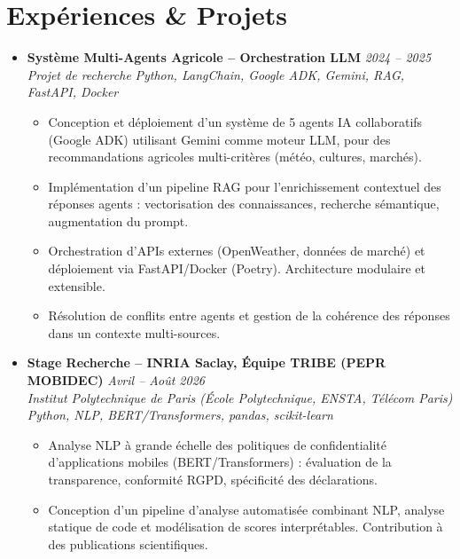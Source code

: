 \documentclass[a4paper,11pt]{article}
\begin{document}
\section{Expériences \& Projets}
\begin{itemize}[leftmargin=*, label={-}]

\item \textbf{Système Multi-Agents Agricole -- Orchestration LLM} \hfill \textit{2024 -- 2025} \\
\textit{Projet de recherche} \hfill \textit{Python, LangChain, Google ADK, Gemini, RAG, FastAPI, Docker}
\vspace{-2pt}
    \begin{itemize}[leftmargin=0.4cm, nosep, label=\tiny$\bullet$]
        \item \small{Conception et déploiement d'un système de 5 agents IA collaboratifs (Google ADK) utilisant Gemini comme moteur LLM, pour des recommandations agricoles multi-critères (météo, cultures, marchés).}
        \item \small{Implémentation d'un pipeline RAG pour l'enrichissement contextuel des réponses agents : vectorisation des connaissances, recherche sémantique, augmentation du prompt.}
        \item \small{Orchestration d'APIs externes (OpenWeather, données de marché) et déploiement via FastAPI/Docker (Poetry). Architecture modulaire et extensible.}
        \item \small{Résolution de conflits entre agents et gestion de la cohérence des réponses dans un contexte multi-sources.}
    \end{itemize}
\vspace{3pt}

\item \textbf{Stage Recherche -- INRIA Saclay, Équipe TRIBE (PEPR MOBIDEC)} \hfill \textit{Avril -- Août 2026} \\
\textit{Institut Polytechnique de Paris (École Polytechnique, ENSTA, Télécom Paris)} \hfill \textit{Python, NLP, BERT/Transformers, pandas, scikit-learn}
\vspace{-2pt}
    \begin{itemize}[leftmargin=0.4cm, nosep, label=\tiny$\bullet$]
        \item \small{Analyse NLP à grande échelle des politiques de confidentialité d'applications mobiles (BERT/Transformers) : évaluation de la transparence, conformité RGPD, spécificité des déclarations.}
        \item \small{Conception d'un pipeline d'analyse automatisée combinant NLP, analyse statique de code et modélisation de scores interprétables. Contribution à des publications scientifiques.}
    \end{itemize}
\vspace{3pt}


\end{itemize}
\end{document}
